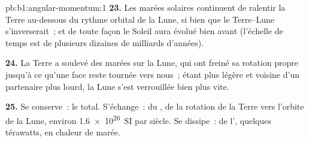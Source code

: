 \begin{solution}{pb:b1:angular-momentum:1}
\textbf{23.} Les marées solaires continuent de ralentir la Terre
au-dessous du rythme orbital de la Lune, si bien que le 
Terre--Lune s'inverserait~; et de toute façon le Soleil aura évolué bien
avant (l'échelle de temps est de plusieurs dizaines de milliards d'années).

\textbf{24.} La Terre a soulevé des marées sur la Lune, qui ont freiné
sa rotation propre jusqu'à ce qu'une face reste tournée vers nous~;
étant plus légère et voisine d'un partenaire plus lourd, la Lune s'est
verrouillée bien plus vite.

\textbf{25.} Se conserve~: le  total. S'échange~: du
, de la rotation de la Terre vers l'orbite de la Lune,
environ \qty{1.6e26}{SI} par siècle. Se dissipe~: de l', quelques térawatts, en chaleur de marée.
\end{solution}

